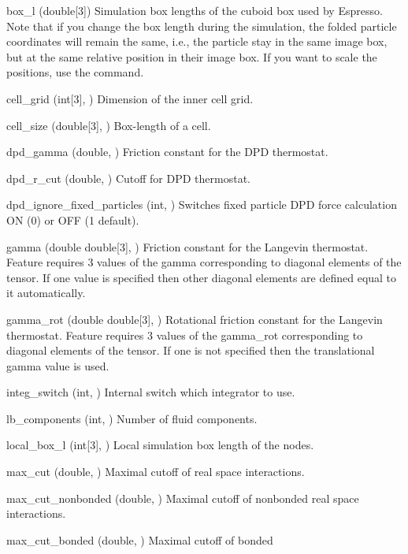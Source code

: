 \begin{globvar}
\item[box_l] (double[3]) Simulation box lengths of the cuboid box used by Espresso. Note that
  if you change the box length during the simulation, the folded
  particle coordinates will remain the same, i.e., the particle stay
  in the same image box, but at the same relative position in their
  image box. If you want to scale the positions, use the
   command.
\item[cell_grid] (int[3], \ro) Dimension of the inner
  cell grid.
\item[cell_size] (double[3], \ro) Box-length of a cell.
\item[dpd_gamma] (double, \ro) Friction constant for the
  DPD thermostat.
\item[dpd_r_cut] (double, \ro) Cutoff for DPD thermostat.
\item[dpd_ignore_fixed_particles] (int, \ro) Switches fixed particle DPD force calculation ON (0) or OFF (1 default).
\item[gamma] (double \asep double[3], \ro) Friction constant for the
  Langevin thermostat. Feature  requires 3
  values of the gamma corresponding to diagonal elements of the tensor.
  If one value is specified then other diagonal elements are defined
  equal to it automatically.
\item[gamma_rot] (double \asep double[3], \ro) Rotational friction constant for the
  Langevin thermostat. Feature  requires 3
  values of the gamma_rot corresponding to diagonal elements of the tensor.
  If one is not specified then the translational gamma value is used.
\item[integ_switch] (int, \ro) Internal switch which integrator to
  use.
\item[lb_components] (int, \ro) Number of fluid components.
\item[local_box_l] (int[3], \ro) Local simulation box length of the
  nodes.
\item[max_cut] (double, \ro) Maximal cutoff of real space
  interactions.
\item[max_cut_nonbonded] (double, \ro) Maximal cutoff of nonbonded
  real space interactions.
\item[max_cut_bonded] (double, \ro) Maximal cutoff of bonded

\end{globvar}
